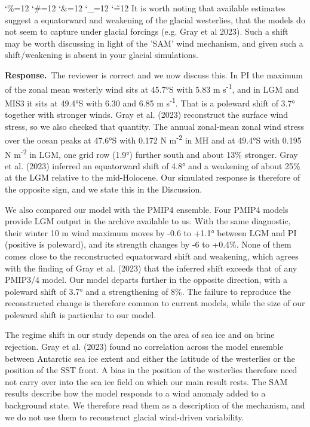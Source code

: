 \documentclass[11pt,a4paper]{article}
\newcommand{\comment}[1]{\par\medskip\noindent\color{black}\begingroup\catcode`\%=12 \catcode`\#=12 \catcode`\&=12 \catcode`\_=12 \catcode`\~=12 \commentbody}
\newcommand{\commentbody}[1]{#1\endgroup\par\smallskip}
\newcommand{\response}{\par\noindent\color{chgcol}\textbf{Response.}\ }
\begin{document}
\comment{R3}{It is worth noting that available estimates suggest a equatorward and weakening of the glacial westerlies, that the models do not seem to capture under glacial forcings (e.g. Gray et al 2023). Such a shift may be worth discussing in light of the 'SAM' wind mechanism, and given such a shift/weakening is absent in your glacial simulations.}


\response The reviewer is correct and we now discuss this. In PI  the maximum of the zonal mean westerly wind  sits at 45.7°S with 5.83 m s\textsuperscript{-1}, and in LGM and MIS3 it sits at 49.4°S with 6.30 and 6.85 m s\textsuperscript{-1}. That is a poleward shift of 3.7° together with stronger winds. Gray et al. (2023) reconstruct the surface wind stress, so we also checked that quantity. The annual zonal-mean zonal wind stress over the ocean peaks at 47.6°S with 0.172 N m\textsuperscript{-2} in MH and at 49.4°S with 0.195 N m\textsuperscript{-2} in LGM, one grid row (1.9°) further south and about 13\% stronger. Gray et al. (2023) inferred an equatorward shift of 4.8° and a weakening of about 25\% at the LGM relative to the mid-Holocene. Our simulated response is therefore of the opposite sign, and we state this in the Discussion.

We also compared our model with the PMIP4 ensemble. Four PMIP4 models provide LGM output in the archive available to us. With the same diagnostic, their winter 10 m wind maximum moves by -0.6 to +1.1° between LGM and PI (positive is poleward), and its strength changes by -6 to +0.4\%. None of them comes close to the reconstructed equatorward shift and weakening, which agrees with the finding of Gray et al. (2023) that the inferred shift exceeds that of any PMIP3/4 model. Our model departs further in the opposite direction, with a poleward shift of 3.7° and a strengthening of 8\%. The failure to reproduce the reconstructed change is therefore common to current models, while the size of our poleward shift is particular to our model.

The regime shift in our study depends on the area of sea ice and on brine rejection. Gray et al. (2023) found no correlation across the model ensemble between Antarctic sea ice extent and either the latitude of the westerlies or the position of the SST front. A bias in the position of the westerlies therefore need not carry over into the sea ice field on which our main result rests. The SAM results describe how the model responds to a wind anomaly added to a background state. We therefore read them as a description of the mechanism, and we do not use them to reconstruct glacial wind-driven variability.
\end{document}
